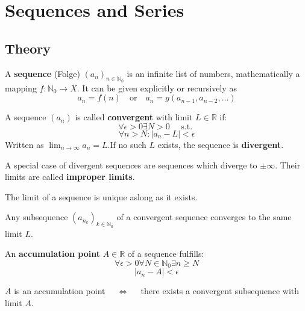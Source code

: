 \section{Sequences and Series}

\subsection{Theory}

\begin{definition}
    A \textbf{sequence} (Folge) $(a_n)_{n \in \mathbb{N}_0}$ is an infinite list of numbers, mathematically a mapping $f: \mathbb{N}_0 \to X$. It can be given explicitly or recursively  as
    $$a_n = f(n) \quad \text{or} \quad a_n = g(a_{n-1}, a_{n-2}, \dots)$$
\end{definition}

\begin{definition}
    A sequence $(a_n)$ is called \textbf{convergent} with limit $L \in \mathbb{R}$ if:
    $$\forall \epsilon \gt 0 \exists N \gt 0 \quad \text{ s.t. }$$
    $$\forall n \gt N : |a_n - L| \lt \epsilon$$
    Written as $\lim_{n \to \infty} a_n = L$.If no such $L$ exists, the sequence is \textbf{divergent}. 
\end{definition}

\begin{remark}
    A special case of divergent sequences are sequences which diverge to $\pm \infty$. Their limits are called \textbf{improper limits}.
\end{remark}

\begin{theorem}
    The limit of a sequence is unique aslong as it exists.
\end{theorem}

\begin{theorem}
    Any subsequence $(a_{n_k})_{k \in \mathbb{N}_0}$ of a convergent sequence converges to the same limit $L$.
\end{theorem}

\begin{definition}
    An \textbf{accumulation point} $A \in \mathbb{R}$ of a sequence fulfills:
    $$\forall \epsilon \gt 0 \forall N \in \mathbb{N}_0 \exists n \ge N$$
    $$|a_n - A| \lt \epsilon$$
\end{definition}


\begin{theorem}
    $A$ is an accumulation point $\quad \iff \quad$ there exists a convergent subsequence with limit $A$.
\end{theorem}

